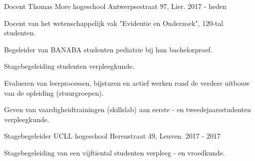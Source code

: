 


\begin{cventries}


\cventry
{Docent} %
{Thomas More hogeschool} %
{Antwerpsestraat 97, Lier.} %
{2017 - heden} %
{ %
\begin{cvitems}
\item Docent van het wetenschappelijk vak "Evidentie en Onderzoek", 120-tal studenten.
\item Begeleider van BANABA studenten pediatrie bij hun bachelorproef.
\item Stagebegeleiding studenten verpleegkunde.
\item Evalueren van leerprocessen, bijsturen en actief werken rond de verdere uitbouw van de opleiding (stuurgroepen).
\item Geven van vaardigheidtrainingen (skillslab) aan eerste - en tweedejaarsstudenten verpleegkunde.
\end{cvitems}
}


\cventry
{Stagebegeleider} %
{UCLL hogeschool} %
{Herenstraat 49, Leuven.} %
{2017 - 2017} %
{ %
	\begin{cvitems}
	\item Stagebegeleiding van een vijftiental studenten verpleeg - en vroedkunde.
	\end{cvitems}
}



\end{cventries}
